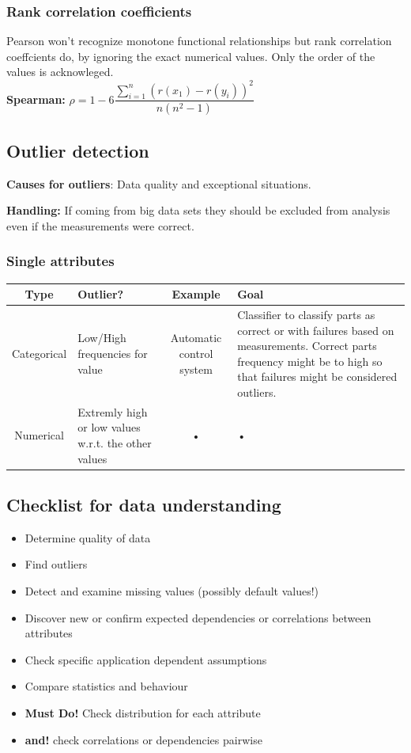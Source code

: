 \documentclass[fleqn, oneside, 10pt, titlepage]{article}
\begin{document}
\subsubsection{Rank correlation coefficients}
Pearson won't recognize monotone functional relationships but rank correlation coeffcients do, by ignoring the exact numerical values.
Only the order of the values is acknowleged.\\

\textbf{Spearman:} $\rho = 1 - 6\dfrac{\sum_{i=1}^n (r(x_1) - r(y_i))^2}{n(n^2-1)}$

\subsection{Outlier detection}
\textbf{Causes for outliers}: Data quality and exceptional situations.

\textbf{Handling:} If coming from big data sets they should be excluded from analysis even if the measurements were correct.
\subsubsection{Single attributes}
\begin{tabular}{|c|p{3cm}|c|p{6cm}|}
\hline 
\textbf{Type} & \textbf{Outlier?} & \textbf{Example} & \textbf{Goal} \\ 
\hline 
Categorical & Low/High frequencies for value & Automatic control system & Classifier to classify parts as correct or with failures based on measurements. Correct parts frequency might be to high so that failures might be considered outliers. \\ 
\hline 
Numerical & Extremly high or low values w.r.t. the other values & • & • \\ 
\hline 
\end{tabular} 

\subsection{Checklist for data understanding}
\begin{itemize}
	\item Determine quality of data
	\item Find outliers
	\item Detect and examine missing values (possibly default values!)
	\item Discover new or confirm expected dependencies or correlations between attributes
	\item Check specific application dependent assumptions
	\item Compare statistics and behaviour
	\item \textbf{Must Do! } Check distribution for each attribute
	\item \textbf{and!} check correlations or dependencies pairwise
\end{itemize}
\end{document}
